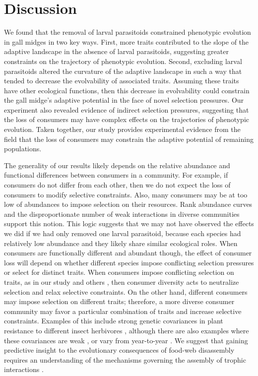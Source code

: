 \documentclass[11pt,]{article}
\begin{document}
\section{Discussion}\label{discussion}

We found that the removal of larval parasitoids constrained phenotypic
evolution in gall midges in two key ways. First, more traits contributed
to the slope of the adaptive landscape in the absence of larval
parasitoids, suggesting greater constraints on the trajectory of
phenotypic evolution. Second, excluding larval parasitoids altered the
curvature of the adaptive landscape in such a way that tended to
decrease the evolvability of associated traits. Assuming these traits
have other ecological functions, then this decrease in evolvability
could constrain the gall midge's adaptive potential in the face of novel
selection pressures. Our experiment also revealed evidence of indirect
selection pressures, suggesting that the loss of consumers may have
complex effects on the trajectories of phenotypic evolution. Taken
together, our study provides experimental evidence from the field that
the loss of consumers may constrain the adaptive potential of remaining
populations.

The generality of our results likely depends on the relative abundance
and functional differences between consumers in a community. For
example, if consumers do not differ from each other, then we do not
expect the loss of consumers to modify selective constraints. Also, many
consumers may be at too low of abundances to impose selection on their
resources. Rank abundance curves \citep{Preston1948} and the
disproportionate number of weak interactions in diverse communities
\citep{Paine1992} support this notion. This logic suggests that we may
not have observed the effects we did if we had only removed one larval
parasitoid, because each species had relatively low abundance
\citep{Barbour2016} and they likely share similar ecological roles. When
consumers are functionally different and abundant though, the effect of
consumer loss will depend on whether different species impose
conflicting selection pressures or select for distinct traits. When
consumers impose conflicting selection on traits, as in our study and
others \citep{Weis1985, Abrahamson1997, Start2016, Start2018}, then
consumer diversity acts to neutralize selection and relax selective
constraints. On the other hand, different consumers may impose selection
on different traits; therefore, a more diverse consumer community may
favor a particular combination of traits and increase selective
constraints. Examples of this include strong genetic covariances in
plant resistance to different insect herbivores
\citep{Maddox1990, Wise2007, Wise2013}, although there are also examples
where these covariances are weak \citep{Roche1997, Barbour2015}, or vary
from year-to-year \citep{Johnson2007}. We suggest that gaining
predictive insight to the evolutionary consequences of food-web
disassembly requires an understanding of the mechanisms governing the
assembly of trophic interactions \citep{Bascompte2009}.
\end{document}
